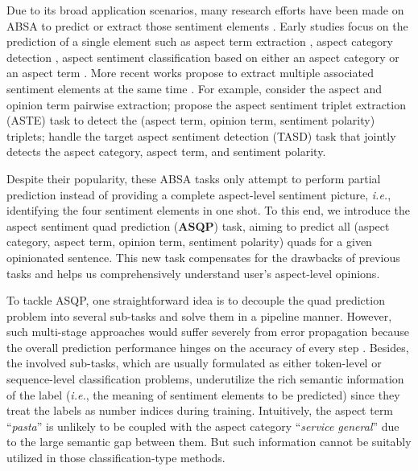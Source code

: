 \documentclass[11pt]{article}
\begin{document}
Due to its broad application scenarios, many research efforts have been made on ABSA to predict or extract those sentiment elements \cite{semeval14-absa, semeval15-absa, semeval16-absa}. Early studies focus on the prediction of a single element such as aspect term extraction \cite{emnlp15-ate, acl18-ate-xuhu}, aspect category detection \cite{aaai15-acp}, aspect sentiment classification based on either an aspect category \cite{emnlp16-ruder-asc-category, emnlp19-asc-category} or an aspect term \cite{emnlp18-asc}. 
More recent works propose to extract multiple associated sentiment elements at the same time \cite{acl21-gabsa}. For example, \citet{acl20-aope} consider the aspect and opinion term pairwise extraction; \citet{aaai20-robin} propose the aspect sentiment triplet extraction (ASTE) task to detect the (aspect term, opinion term, sentiment polarity) triplets; \citet{aaai20-tasd} handle the target aspect sentiment detection (TASD) task that jointly detects the aspect category, aspect term, and sentiment polarity. 

Despite their popularity, these ABSA tasks only attempt to perform partial prediction instead of providing a complete aspect-level sentiment picture, \textit{i.e.}, identifying the four sentiment elements in one shot. 
To this end, we introduce the aspect sentiment quad prediction (\textbf{ASQP}) task, aiming to predict all (aspect category, aspect term, opinion term, sentiment polarity) quads for a given opinionated sentence. This new task compensates for the drawbacks of previous tasks and helps us comprehensively understand user’s aspect-level opinions.

To tackle ASQP, one straightforward idea is to decouple the quad prediction problem into several sub-tasks and solve them in a pipeline manner. However, such multi-stage approaches would suffer severely from error propagation because the overall prediction performance hinges on the accuracy of every step \cite{aaai20-robin, acl20-aope}. 
Besides, the involved sub-tasks, which are usually formulated as either token-level or sequence-level classification problems, underutilize the rich semantic information of the label (\textit{i.e.}, the meaning of sentiment elements to be predicted) since they treat the labels as number indices during training. Intuitively, the aspect term ``\textit{pasta}'' is unlikely to be coupled with the aspect category ``\textit{service general}'' due to the large semantic gap between them. But such information cannot be suitably utilized in those classification-type methods.
\end{document}
